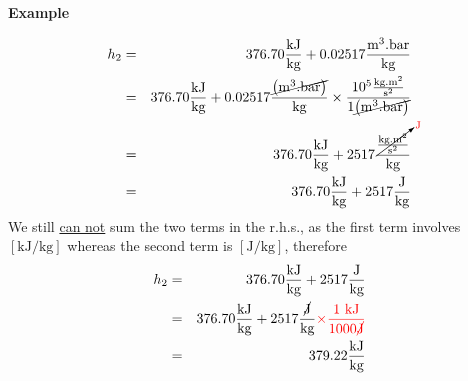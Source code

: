 \begin{MyExample}{\begin{center}{\bf Example}\end{center}}
       \begin{eqnarray}
         h_{2} &=& 376.70\displaystyle\frac{\text{kJ}}{\text{kg}} + 0.02517 \displaystyle\frac{\text{m}^{3}.\text{bar}}{\text{kg}} \nonumber \\
              &=& 376.70\displaystyle\frac{\text{kJ}}{\text{kg}} + 0.02517 \displaystyle\frac{\cancel{\left(\text{m}^{3}.\text{bar}\right)}}{\text{kg}} \times \displaystyle\frac{10^{5} \frac{\text{kg.m}^{2}}{\text{s}^{2}}}{1 \cancel{\left(\text{m}^{3}.\text{bar}\right)}} \nonumber \\
              &=& 376.70\displaystyle\frac{\text{kJ}}{\text{kg}} + 2517 \displaystyle\frac{\cancelto{\textcolor{red}{\text{J}}}{\frac{\text{kg.m}^{2}}{\text{s}^{2}}}}{\text{kg}}\nonumber\\
              &=& 376.70\displaystyle\frac{\text{kJ}}{\text{kg}} + 2517 \displaystyle\frac{\text{J}}{\text{kg}} \nonumber
       \end{eqnarray}
       We still \underline{can not} sum the two terms in the r.h.s., as the first term involves $\left[\text{kJ/kg}\right]$ whereas the second term is $\left[\text{J/kg}\right]$, therefore
       \begin{eqnarray}
         h_{2} &=& 376.70\displaystyle\frac{\text{kJ}}{\text{kg}} + 2517 \displaystyle\frac{\text{J}}{\text{kg}} \nonumber\\
              &=& 376.70\displaystyle\frac{\text{kJ}}{\text{kg}} + 2517 \displaystyle\frac{\cancel{\text{J}}}{\text{kg}} \textcolor{red}{\times \displaystyle\frac{1\text{ kJ}}{1000 \cancel{\text{J}}}}\nonumber\\
              &=& 379.22 \displaystyle\frac{\text{kJ}}{\text{kg}}\nonumber
       \end{eqnarray}

   \end{MyExample}
   

